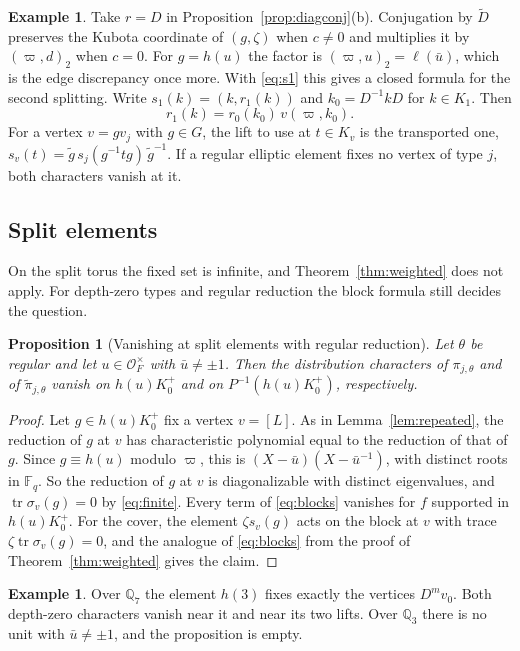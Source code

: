 \documentclass[12pt,letterpaper]{article}
\numberwithin{equation}{section}
\newtheorem{proposition}[theorem]{Proposition}
\theoremstyle{definition}
\newtheorem{example}[theorem]{Example}
\theoremstyle{remark}
\newcommand{\OO}{\mathcal O_F}
\newcommand{\kk}{\mathbb F_q}
\newcommand{\tr}{\operatorname{tr}}
\begin{document}
\begin{example}\label{ex:r1}
Take $r=D$ in Proposition~\ref{prop:diagconj}(b). Conjugation by $\widetilde D$ preserves the Kubota coordinate of $(g,\zeta)$ when $c\ne0$ and multiplies it by $(\varpi,d)_2$ when $c=0$. For $g=h(u)$ the factor is $(\varpi,u)_2=\ell(\bar u)$, which is the edge discrepancy once more. With \eqref{eq:s1} this gives a closed formula for the second splitting. Write $s_1(k)=(k,r_1(k))$ and $k_0=D^{-1}kD$ for $k\in K_1$. Then
\[
 r_1(k)=r_0(k_0)\,v(\varpi,k_0).
\]
For a vertex $v=gv_j$ with $g\in G$, the lift to use at $t\in K_v$ is the transported one, $s_v(t)=\widetilde g\,s_j(g^{-1}tg)\,\widetilde g^{-1}$. If a regular elliptic element fixes no vertex of type $j$, both characters vanish at it.
\end{example}

\subsection{Split elements}
On the split torus the fixed set is infinite, and Theorem~\ref{thm:weighted} does not apply. For depth-zero types and regular reduction the block formula still decides the question.

\begin{proposition}[Vanishing at split elements with regular reduction]\label{prop:splitvanish}
Let $\theta$ be regular and let $u\in\OO^\times$ with $\bar u\ne\pm1$. Then the distribution characters of $\pi_{j,\theta}$ and of $\widetilde\pi_{j,\theta}$ vanish on $h(u)K_0^+$ and on $P^{-1}(h(u)K_0^+)$, respectively.
\end{proposition}
\begin{proof}
Let $g\in h(u)K_0^+$ fix a vertex $v=[L]$. As in Lemma~\ref{lem:repeated}, the reduction of $g$ at $v$ has characteristic polynomial equal to the reduction of that of $g$. Since $g\equiv h(u)$ modulo $\varpi$, this is $(X-\bar u)(X-\bar u^{-1})$, with distinct roots in $\kk$. So the reduction of $g$ at $v$ is diagonalizable with distinct eigenvalues, and $\tr\sigma_v(g)=0$ by \eqref{eq:finite}. Every term of \eqref{eq:blocks} vanishes for $f$ supported in $h(u)K_0^+$. For the cover, the element $\zeta s_v(g)$ acts on the block at $v$ with trace $\zeta\tr\sigma_v(g)=0$, and the analogue of \eqref{eq:blocks} from the proof of Theorem~\ref{thm:weighted} gives the claim.
\end{proof}

\begin{example}
Over $\mathbb Q_7$ the element $h(3)$ fixes exactly the vertices $D^mv_0$. Both depth-zero characters vanish near it and near its two lifts. Over $\mathbb Q_3$ there is no unit with $\bar u\ne\pm1$, and the proposition is empty.
\end{example}
\end{document}
